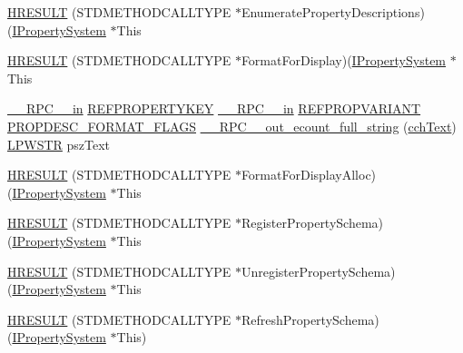 \begin{DoxyCompactItemize}
\item 
\hyperlink{struct_i_property_system_vtbl_ade59513aad7981b9f9eaffe67494d4d4}{H\+R\+E\+S\+U\+LT} (S\+T\+D\+M\+E\+T\+H\+O\+D\+C\+A\+L\+L\+T\+Y\+PE $\ast$Enumerate\+Property\+Descriptions)(\hyperlink{propsys_8h_ab577bba4a52d519b12be02b0b88b71d1}{I\+Property\+System} $\ast$This
\item 
\hyperlink{struct_i_property_system_vtbl_a7e0eb9938e5e4463dd67e6a2324af510}{H\+R\+E\+S\+U\+LT} (S\+T\+D\+M\+E\+T\+H\+O\+D\+C\+A\+L\+L\+T\+Y\+PE $\ast$Format\+For\+Display)(\hyperlink{propsys_8h_ab577bba4a52d519b12be02b0b88b71d1}{I\+Property\+System} $\ast$This
\item 
\hyperlink{rpcsal_8h_a20b7f6da600a05c8b541659f14f7f0e6}{\+\_\+\+\_\+\+R\+P\+C\+\_\+\+\_\+in} \hyperlink{propkeydef_8h_a3e01280fe3a0b979f5a1926d5a8754af}{R\+E\+F\+P\+R\+O\+P\+E\+R\+T\+Y\+K\+EY} \hyperlink{rpcsal_8h_a20b7f6da600a05c8b541659f14f7f0e6}{\+\_\+\+\_\+\+R\+P\+C\+\_\+\+\_\+in} \hyperlink{propidl_8h_ac8a8bd0f5f7f9b7e9f8e6fd4fd039fda}{R\+E\+F\+P\+R\+O\+P\+V\+A\+R\+I\+A\+NT} \hyperlink{propsys_8h_a2aebc32bcab5d49a6377d14902ec66e2}{P\+R\+O\+P\+D\+E\+S\+C\+\_\+\+F\+O\+R\+M\+A\+T\+\_\+\+F\+L\+A\+GS} \hyperlink{struct_i_property_system_vtbl_ac1c47fc095b3ad46850abe3144681e0f}{\+\_\+\+\_\+\+R\+P\+C\+\_\+\+\_\+out\+\_\+ecount\+\_\+full\+\_\+string} (\hyperlink{struct_i_property_system_vtbl_ab9c1dba738c0a5120026024d79d9be6b}{cch\+Text}) \hyperlink{mapinls_8h_acc28f72b93422cfd63a60e5a102a77b1}{L\+P\+W\+S\+TR} psz\+Text
\item 
\hyperlink{struct_i_property_system_vtbl_ad61e5ada423e749f1db90b6397db8dba}{H\+R\+E\+S\+U\+LT} (S\+T\+D\+M\+E\+T\+H\+O\+D\+C\+A\+L\+L\+T\+Y\+PE $\ast$Format\+For\+Display\+Alloc)(\hyperlink{propsys_8h_ab577bba4a52d519b12be02b0b88b71d1}{I\+Property\+System} $\ast$This
\item 
\hyperlink{struct_i_property_system_vtbl_a6589b85e9f7b6568e3d6de06fb41f3a7}{H\+R\+E\+S\+U\+LT} (S\+T\+D\+M\+E\+T\+H\+O\+D\+C\+A\+L\+L\+T\+Y\+PE $\ast$Register\+Property\+Schema)(\hyperlink{propsys_8h_ab577bba4a52d519b12be02b0b88b71d1}{I\+Property\+System} $\ast$This
\item 
\hyperlink{struct_i_property_system_vtbl_abf99d72330a64bfd99b8fb5fde9bd7bb}{H\+R\+E\+S\+U\+LT} (S\+T\+D\+M\+E\+T\+H\+O\+D\+C\+A\+L\+L\+T\+Y\+PE $\ast$Unregister\+Property\+Schema)(\hyperlink{propsys_8h_ab577bba4a52d519b12be02b0b88b71d1}{I\+Property\+System} $\ast$This
\item 
\hyperlink{struct_i_property_system_vtbl_a9604e6403b33a282514801f7a2a5aa77}{H\+R\+E\+S\+U\+LT} (S\+T\+D\+M\+E\+T\+H\+O\+D\+C\+A\+L\+L\+T\+Y\+PE $\ast$Refresh\+Property\+Schema)(\hyperlink{propsys_8h_ab577bba4a52d519b12be02b0b88b71d1}{I\+Property\+System} $\ast$This)
\end{DoxyCompactItemize}
